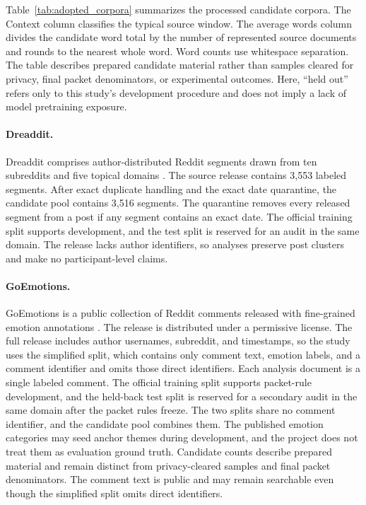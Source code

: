 Table~\ref{tab:adopted_corpora} summarizes the processed candidate corpora. The Context column classifies the typical source window. The average words column divides the candidate word total by the number of represented source documents and rounds to the nearest whole word. Word counts use whitespace separation. The table describes prepared candidate material rather than samples cleared for privacy, final packet denominators, or experimental outcomes. Here, ``held out'' refers only to this study's development procedure and does not imply a lack of model pretraining exposure.

\paragraph{Dreaddit.}
Dreaddit comprises author-distributed Reddit segments drawn from ten subreddits and five topical domains \citep{turcan2019dreaddit}. The source release contains 3,553 labeled segments. After exact duplicate handling and the exact date quarantine, the candidate pool contains 3,516 segments. The quarantine removes every released segment from a post if any segment contains an exact date. The official training split supports development, and the test split is reserved for an audit in the same domain. The release lacks author identifiers, so analyses preserve post clusters and make no participant-level claims.

\paragraph{GoEmotions.}
GoEmotions is a public collection of Reddit comments released with fine-grained emotion annotations \citep{demszky2020goemotions}. The release is distributed under a permissive license. The full release includes author usernames, subreddit, and timestamps, so the study uses the simplified split, which contains only comment text, emotion labels, and a comment identifier and omits those direct identifiers. Each analysis document is a single labeled comment. The official training split supports packet-rule development, and the held-back test split is reserved for a secondary audit in the same domain after the packet rules freeze. The two splits share no comment identifier, and the candidate pool combines them. The published emotion categories may seed anchor themes during development, and the project does not treat them as evaluation ground truth. Candidate counts describe prepared material and remain distinct from privacy-cleared samples and final packet denominators. The comment text is public and may remain searchable even though the simplified split omits direct identifiers.

